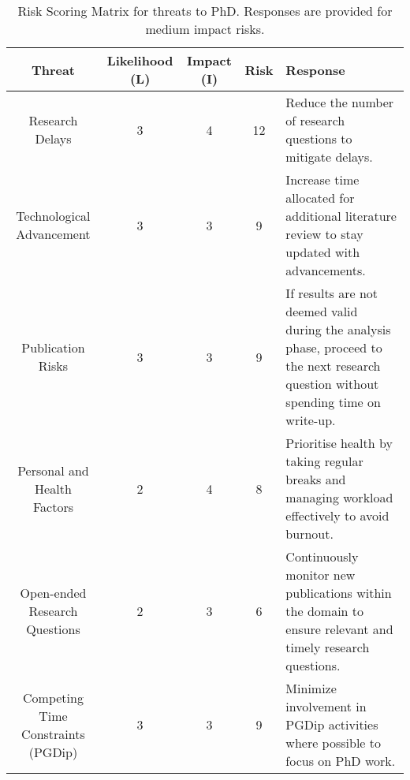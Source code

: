 \begin{table}[t]
\centering
\footnotesize
\begin{tabular}{|c|c|c|c|>{\raggedright\arraybackslash}p{10cm}|}
\hline
\textbf{Threat} & \textbf{Likelihood (L)} & \textbf{Impact (I)} & \textbf{Risk} & \textbf{Response} \\
\hline
Research Delays & 3 & 4 & 12 & Reduce the number of research questions to mitigate delays. \\
\hline
Technological Advancement & 3 & 3 & 9 & Increase time allocated for additional literature review to stay updated with advancements. \\
\hline
Publication Risks & 3 & 3 & 9 & If results are not deemed valid during the analysis phase, proceed to the next research question without spending time on write-up. \\
\hline
Personal and Health Factors & 2 & 4& 8  & Prioritise health by taking regular breaks and managing workload effectively to avoid burnout. \\
\hline
Open-ended Research Questions & 2 & 3 & 6 & Continuously monitor new publications within the domain to ensure relevant and timely research questions. \\
\hline
Competing Time Constraints (PGDip) & 3 & 3 & 9 & Minimize involvement in PGDip activities where possible to focus on PhD work. \\
\hline
\end{tabular}
\caption{Risk Scoring Matrix for threats to PhD. Responses are provided for medium impact risks.}
\label{tab:risk_matrix}
\end{table}